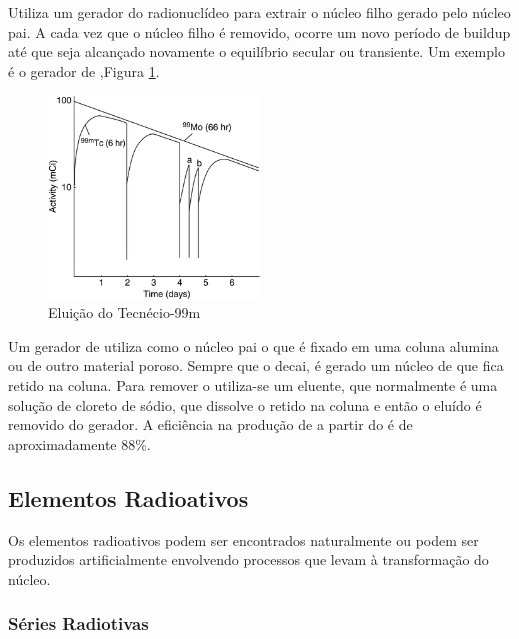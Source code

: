 \documentclass[11pt,a4paper]{article}
\newcounter{exemplo}
\begin{document}
                Utiliza um gerador do radionuclídeo para extrair o núcleo filho gerado pelo núcleo pai. A cada vez que o núcleo filho é removido, ocorre um novo período de buildup até que seja alcançado novamente o equilíbrio secular ou transiente. Um exemplo é o gerador de ,Figura \ref{fig:graficoEluicaoTecnecio}.


                    \begin{figure}[h]
                        \centering
                        \includegraphics[width=0.5\textwidth]{Imagens/graficoEluicaoTecnecio.jpg}
                        \caption{Eluição do Tecnécio-99m}
                        \label{fig:graficoEluicaoTecnecio}
                    \end{figure}

                Um gerador de  utiliza como o núcleo pai o  que é fixado em uma coluna alumina ou de outro material poroso. Sempre que o  decai, é gerado um núcleo de  que fica retido na coluna. Para remover o  utiliza-se um eluente, que normalmente é uma solução de cloreto de sódio, que dissolve o  retido na coluna e então o  eluído é removido do gerador. A eficiência na produção de  a partir do  é de aproximadamente 88\%.
             
        \subsection{Elementos Radioativos}
            
            Os elementos radioativos podem ser encontrados naturalmente ou podem ser produzidos artificialmente envolvendo processos que levam à transformação do núcleo.

            \subsubsection{Séries Radiotivas}
            
\end{document}
